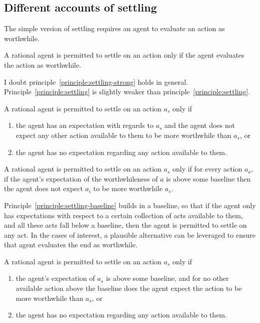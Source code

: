 \documentclass[10pt]{article}
\begin{document}
\subsection{Different accounts of settling}
\label{sec:diff-acco-settl}

The simple version of settling requires an agent to evaluate an action as worthwhile.

\begin{principle}\label{principle:settling-strong}
  A rational agent is permitted to settle on an action only if the agent evaluates the action as worthwhile.
\end{principle}

I doubt principle~\ref{principle:settling-strong} holds in general.
Principle~\ref{principle:settling} is slightly weaker than principle~\ref{principle:settling}.

\begin{principle}[Settling]\label{principle:settling}
  A rational agent is permitted to settle on an action \(a_{s}\) only if
  \begin{enumerate}[noitemsep]
  \item the agent has an expectation with regards to \(a_{s}\) and the agent does not expect any other action available to them to be more worthwhile than \(a_{s}\), or
  \item the agent has no expectation regarding any action available to them.
  \end{enumerate}
\end{principle}

\begin{principle}\label{principle:settling-baseline}
  A rational agent is permitted to settle on an action \(a_{s}\) only if for every action \(a_{o}\), if the agent's expectation of the worthwhileness of \(a\) is above some baseline then the agent does not expect \(a_{i}\) to be more worthwhile \(a_{s}\).
\end{principle}

Principle~\ref{principle:settling-baseline} builds in a baseline, so that if the agent only has expectations with respect to a certain collection of acts available to them, and all these acts fall below a baseline, then the agent is permitted to settle on any act.
In the cases of interest, a plausible alternative can be leveraged to ensure that agent evaluates the end as worthwhile.

\begin{principle}[Settling]\label{principle:settling}
  A rational agent is permitted to settle on an action \(a_{s}\) only if
  \begin{enumerate}[noitemsep]
  \item the agent's expectation of \(a_{s}\) is above some baseline, and for no other available action above the baseline does the agent expect the action to be more worthwhile than \(a_{s}\), or
  \item the agent has no expectation regarding any action available to them.
  \end{enumerate}
\end{principle}
\end{document}
